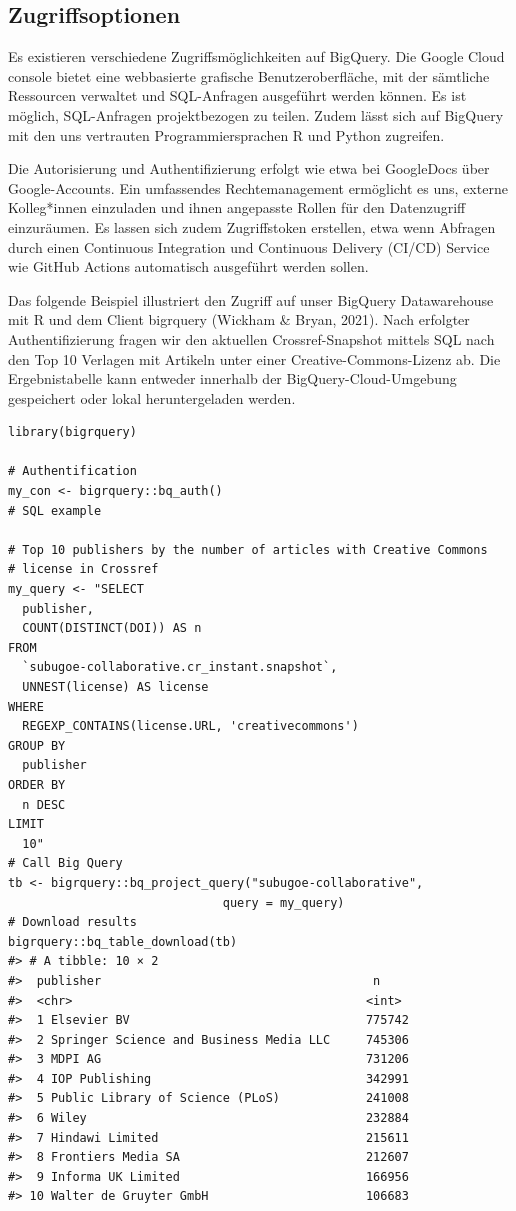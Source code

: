 \documentclass[a4paper,
fontsize=11pt,
oneside,
numbers=noperiodatend,
parskip=half-,
bibliography=totoc,
final
]{scrartcl}
\begin{document}
\hypertarget{zugriffsoptionen}{%
\subsection{Zugriffsoptionen}\label{zugriffsoptionen}}

Es existieren verschiedene Zugriffsmöglichkeiten auf BigQuery. Die
Google Cloud console bietet eine webbasierte grafische
Benutzeroberfläche, mit der sämtliche Ressourcen verwaltet und
SQL-Anfragen ausgeführt werden können. Es ist möglich, SQL-Anfragen
projektbezogen zu teilen. Zudem lässt sich auf BigQuery mit den uns
vertrauten Programmiersprachen R und Python zugreifen.

Die Autorisierung und Authentifizierung erfolgt wie etwa bei GoogleDocs
über Google-Accounts. Ein umfassendes Rechtemanagement ermöglicht es
uns, externe Kolleg*innen einzuladen und ihnen angepasste Rollen für den
Datenzugriff einzuräumen. Es lassen sich zudem Zugriffstoken erstellen,
etwa wenn Abfragen durch einen Continuous Integration und Continuous
Delivery (CI/CD) Service wie GitHub Actions automatisch ausgeführt
werden sollen.

Das folgende Beispiel illustriert den Zugriff auf unser BigQuery
Datawarehouse mit R und dem Client bigrquery (Wickham \& Bryan, 2021).
Nach erfolgter Authentifizierung fragen wir den aktuellen
Crossref-Snapshot mittels SQL nach den Top 10 Verlagen mit Artikeln
unter einer Creative-Commons-Lizenz ab. Die Ergebnistabelle kann
entweder innerhalb der BigQuery-Cloud-Umgebung gespeichert oder lokal
heruntergeladen werden.

\pagebreak
\begin{verbatim}
library(bigrquery)
 
# Authentification
my_con <- bigrquery::bq_auth()
# SQL example
 
# Top 10 publishers by the number of articles with Creative Commons
# license in Crossref
my_query <- "SELECT
  publisher,
  COUNT(DISTINCT(DOI)) AS n
FROM
  `subugoe-collaborative.cr_instant.snapshot`,
  UNNEST(license) AS license
WHERE
  REGEXP_CONTAINS(license.URL, 'creativecommons')
GROUP BY
  publisher
ORDER BY
  n DESC
LIMIT
  10"
# Call Big Query
tb <- bigrquery::bq_project_query("subugoe-collaborative",
                              query = my_query)
# Download results
bigrquery::bq_table_download(tb)
#> # A tibble: 10 × 2
#>  publisher                                      n
#>  <chr>                                         <int>
#>  1 Elsevier BV                                 775742
#>  2 Springer Science and Business Media LLC     745306
#>  3 MDPI AG                                     731206
#>  4 IOP Publishing                              342991
#>  5 Public Library of Science (PLoS)            241008
#>  6 Wiley                                       232884
#>  7 Hindawi Limited                             215611
#>  8 Frontiers Media SA                          212607
#>  9 Informa UK Limited                          166956
#> 10 Walter de Gruyter GmbH                      106683
\end{verbatim}
\end{document}
